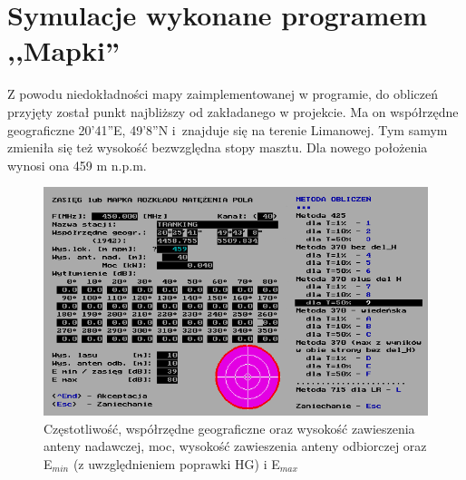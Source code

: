 \documentclass[12pt, a4paper, oneside]{article}
\begin{document}
\section{Symulacje wykonane programem ,,Mapki''}
\indent\indent Z powodu niedokładności mapy zaimplementowanej w programie, do obliczeń przyjęty został punkt najbliższy od zakładanego w projekcie. Ma on współrzędne geograficzne 20’41”E, 49’8”N i~znajduje się na terenie Limanowej. Tym samym zmieniła się też wysokość bezwzględna stopy masztu. Dla nowego położenia wynosi ona 459 m n.p.m.
\begin{figure}[h!]
\centering
\includegraphics[scale=0.85]{pics/mapki/f1.png}
\caption{Częstotliwość, współrzędne geograficzne oraz wysokość zawieszenia anteny nadawczej, moc, wysokość zawieszenia anteny odbiorczej oraz E$_{min}$ (z uwzględnieniem poprawki HG) i E$_{max}$}
\end{figure}
\end{document}
